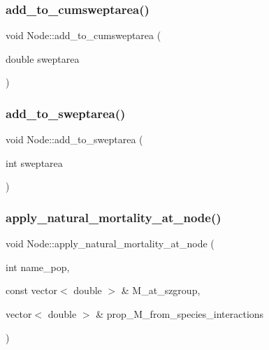 \subsubsection{\texorpdfstring{add\_to\_cumsweptarea()}{add\_to\_cumsweptarea()}}
{\footnotesize\ttfamily void Node\+::add\+\_\+to\+\_\+cumsweptarea (\begin{DoxyParamCaption}\item[{double}]{sweptarea }\end{DoxyParamCaption})}

\mbox{\label{class_node_aae298a7cb5a230092a2f8d8c699c8e1d}} 
\subsubsection{\texorpdfstring{add\_to\_sweptarea()}{add\_to\_sweptarea()}}
{\footnotesize\ttfamily void Node\+::add\+\_\+to\+\_\+sweptarea (\begin{DoxyParamCaption}\item[{int}]{sweptarea }\end{DoxyParamCaption})}

\mbox{\label{class_node_a566cc4cc020a4877e908076515e7090b}} 
\subsubsection{\texorpdfstring{apply\_natural\_mortality\_at\_node()}{apply\_natural\_mortality\_at\_node()}}
{\footnotesize\ttfamily void Node\+::apply\+\_\+natural\+\_\+mortality\+\_\+at\+\_\+node (\begin{DoxyParamCaption}\item[{int}]{name\+\_\+pop,  }\item[{const vector$<$ double $>$ \&}]{M\+\_\+at\+\_\+szgroup,  }\item[{vector$<$ double $>$ \&}]{prop\+\_\+\+M\+\_\+from\+\_\+species\+\_\+interactions }\end{DoxyParamCaption})}

\mbox{\label{class_node_adba706d932c6e61ba0304608f84e17fe}} 
